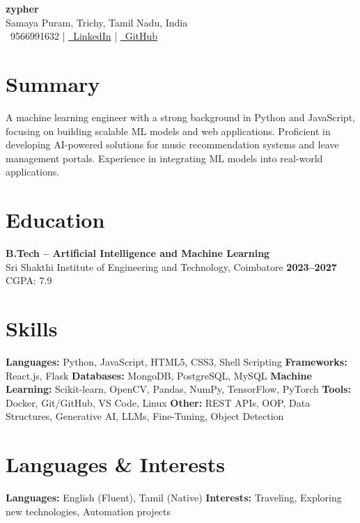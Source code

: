 \documentclass[a4paper,12pt]{article}
\begin{document}
\begin{center}
    {\Huge \textbf{\textcolor{accent}{zypher}}} \\[2pt]
    Samaya Puram, Trichy, Tamil Nadu, India \\[4pt]
    \faPhone\ 9566991632 \quad | \quad
    \href{https://www.linkedin.com/in/zypher}{\faLinkedin\ LinkedIn} \quad | \quad
    \href{https://github.com/zypher046}{\faGithub\ GitHub}
\end{center}

\section*{Summary}
A machine learning engineer with a strong background in Python and JavaScript, focusing on building scalable ML models and web applications. Proficient in developing AI-powered solutions for music recommendation systems and leave management portals. Experience in integrating ML models into real-world applications.

\section*{Education}
\textbf{B.Tech – Artificial Intelligence and Machine Learning} \\
Sri Shakthi Institute of Engineering and Technology, Coimbatore  
\hfill \textbf{2023–2027} \\
CGPA: 7.9

\section*{Skills}
\textbf{Languages:} Python, JavaScript, HTML5, CSS3, Shell Scripting  
\textbf{Frameworks:} React.js, Flask  
\textbf{Databases:} MongoDB, PostgreSQL, MySQL  
\textbf{Machine Learning:} Scikit-learn, OpenCV, Pandas, NumPy, TensorFlow, PyTorch  
\textbf{Tools:} Docker, Git/GitHub, VS Code, Linux  
\textbf{Other:} REST APIs, OOP, Data Structures, Generative AI, LLMs, Fine-Tuning, Object Detection

\section*{Languages \& Interests}
\textbf{Languages:} English (Fluent), Tamil (Native)  
\textbf{Interests:} Traveling, Exploring new technologies, Automation projects
\end{document}
